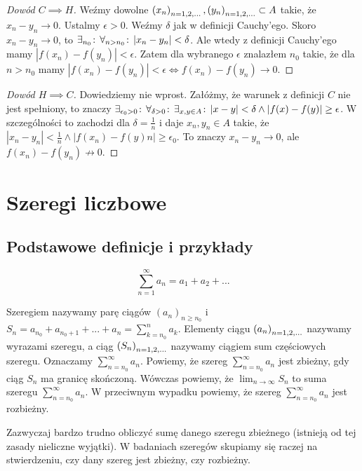 \documentclass[9pt]{article}
\begin{document}
\begin{proof}[Dowód $C \implies H$]
    Weźmy dowolne $\left(x_n\right)_{n = 1,2,...}, \left(y_n\right)_{n = 1,2,...} \subset A$ takie, że $x_n - y_n \to 0$. Ustalmy
    $\epsilon > 0$. Weźmy $\delta$ jak w definicji Cauchy'ego. Skoro $x_n - y_n \to 0$, to
    $\exists_{n_0} \! : \,\forall_{n > n_0} \! : \, \left|x_n - y_n\right| < \delta$. Ale wtedy z definicji Cauchy'ego mamy
    $\left|f(x_n) - f(y_n)\right| < \epsilon$. Zatem dla wybranego $\epsilon$ znalazłem $n_0$ takie,
    że dla $n > n_0$ mamy $\left|f(x_n) - f(y_n)\right| < \epsilon \iff f(x_n) - f(y_n) \to 0$.
\end{proof}

\begin{proof}[Dowód $H \implies C$]
    Dowiedziemy nie wprost. Załóżmy, że warunek z definicji $C$ nie jest spełniony, to znaczy
    $\exists_{\epsilon_0 > 0} \! : \,\forall_{\delta > 0} \! : \,\exists_{x, y \in A} \! : \, \left|x-y\right| < \delta \land
    \left|f(x)-f(y)\right| \ge \epsilon$. W szczególności to zachodzi dla $\delta = \frac{1}{n}$
    i daje $x_n, y_n \in A$ takie, że
    $\left|x_n - y_n\right| < \frac{1}{n} \land \left|f(x_n) - f(y)n\right| \ge \epsilon_0$.
    To znaczy $x_n - y_n \to 0$, ale $f(x_n) - f(y_n) \not\to 0$.
\end{proof}

\section{Szeregi liczbowe}

\subsection{Podstawowe definicje i przykłady}

\[
    \sum_{n = 1}^{\infty} a_n = a_1 + a_2 + ...
\]

\begin{Def}
    Szeregiem nazywamy parę ciągów $\left(a_n\right)_{n \ge n_0}$ i
    $S_n = a_{n_0} + a_{n_0+1} + ... + a_n = \sum_{k = n_0}^n a_k$. Elementy ciągu
    $\left(a_n\right)_{n = 1,2,...}$ nazywamy wyrazami szeregu, a ciąg $\left(S_n\right)_{n = 1,2,...}$ nazywamy ciągiem sum
    częściowych szeregu. Oznaczamy $\sum_{n = n_0}^{\infty} a_n$. Powiemy, że szereg
    $\sum_{n = n_0}^{\infty}a_n$ jest zbieżny, gdy ciąg $S_n$ ma granicę skończoną. Wówczas powiemy, że
    $\lim_{n \to \infty}S_n$ to suma szeregu $\sum_{n = n_0}^{\infty}a_n$. W przeciwnym wypadku
    powiemy, że szereg $\sum_{n = n_0}^{\infty} a_n$ jest rozbieżny.
\end{Def}

Zazwyczaj bardzo trudno obliczyć sumę danego szeregu zbieżnego (istnieją od tej zasady nieliczne
wyjątki). W badaniach szeregów skupiamy się raczej na stwierdzeniu, czy dany szereg jest zbieżny,
czy rozbieżny.
\end{document}
